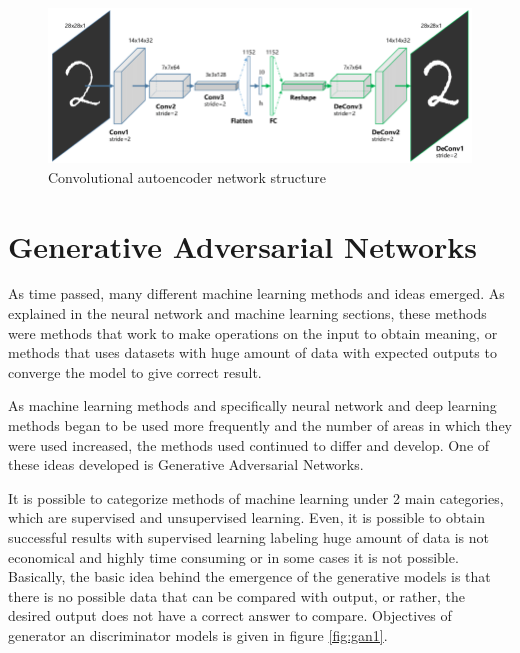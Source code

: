 \begin{figure}[h!]
    \centering
    \includegraphics[width=13cm]{figures/chapter3/mnist_autoencoder.png}
    \vspace*{3mm}
    \caption{Convolutional autoencoder network structure \cite{autoencoders}}
    \label{fig:mnist_autoencoder}
\end{figure}

\section{Generative Adversarial Networks}

As time passed, many different machine learning methods and ideas emerged. As explained in the neural network and machine learning sections, these methods were methods that work to make operations on the input to obtain meaning, or methods that uses datasets with huge amount of data with expected outputs to converge the model to give correct result.

As machine learning methods and specifically neural network and deep learning methods began to be used more frequently and the number of areas in which they were used increased, the methods used continued to differ and develop. One of these ideas developed is Generative Adversarial Networks.

It is possible to categorize methods of machine learning under 2 main categories, which are supervised and unsupervised learning. Even, it is possible to obtain successful results with supervised learning labeling huge amount of data is not economical and highly time consuming or in some cases it is not possible. Basically, the basic idea behind the emergence of the generative models is that there is no possible data that can be compared with output, or rather, the desired output does not have a correct answer to compare. Objectives of generator an discriminator models is given in figure \ref{fig:gan1}.

